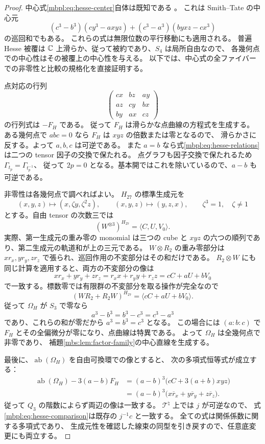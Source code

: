 \begin{proof}
中心式\eqref{mbpl:eq:hesse-center}自体は既知である
\cite[Section~2, p.~3, the formula for $3c_3$]{GRSklyaninDLL}。
これは Smith--Tate の中心元
\[
 (c^3-b^3)(cy^3-a xyz)+(c^3-a^3)(b yxz-cx^3)
\]
の巡回和でもある\cite[p.~35, Remark~(1)]{GRSklyaninST}。
これらの式は無限位数の平行移動にも適用される。
普遍 Hesse 被覆は $\mathbb C$ 上滑らか、従って被約であり、$S_4$ は局所自由なので、
各幾何点での中心性はその被覆上の中心性を与える。
以下では、中心式の全ファイバーでの非零性と比較の規格化を直接証明する。

点対応の行列
\[
 \begin{pmatrix}
 cx&bz&ay\\ az&cy&bx\\ by&ax&cz
 \end{pmatrix}
\]
の行列式は $-F_H$ である。
従って $F_H$ は滑らかな点曲線の方程式を生成する。
ある幾何点で $abc=0$ なら $F_H$ は $xyz$ の倍数または零となるので、
滑らかさに反する。よって $a,b,c$ は可逆である。
また $a=b$ なら式\eqref{mbpl:eq:hesse-relations}は二つの tensor 因子の交換で保たれる。
点グラフも因子交換で保たれるため $\Gamma_{t_p}=\Gamma_{t_p^{-1}}$、
従って $2p=0$ となる。基本開ではこれを除いているので、$a-b$ も可逆である。

非零性は各幾何点で調べればよい。
$H_{27}$ の標準生成元を
\[
 (x,y,z)\longmapsto(x,\zeta y,\zeta^2z),\qquad
 (x,y,z)\longmapsto(y,z,x),\qquad \zeta^3=1,\quad\zeta\ne1
\]
とする。自由 tensor の次数三では
\[
 (W^{\otimes3})^{H_{27}}=\langle C,U,V_0\rangle.
\]
実際、第一生成元の重み零の monomial は三つの cube と
$xyz$ の六つの順列であり、第二生成元の軌道和が上の三元である。
$W\otimes R_2$ の重み零部分は
$xr_x,yr_y,zr_z$ で張られ、巡回作用の不変部分はその和だけである。
$R_2\otimes W$ にも同じ計算を適用すると、両方の不変部分の像は
\[
 xr_x+yr_y+zr_z=r_xx+r_yy+r_zz=cC+aU+bV_0
\]
で一致する。標数零では有限群の不変部分を取る操作が完全なので
\begin{equation}\label{mbpl:eq:hesse-invariant-relation}
 (WR_2+R_2W)^{H_{27}}=\langle cC+aU+bV_0\rangle.
\end{equation}
従って $\Omega_H$ が $S_3$ で零なら
\[
 a^3-b^3=b^3-c^3=c^3-a^3
\]
であり、これらの和が零だから $a^3=b^3=c^3$ となる。
この場合には $(a:b:c)$ で $F_H$ とその全偏微分が零になり、点曲線は特異である。
よって $\Omega_H$ は全幾何点で非零であり、
補題\ref{mbs:lem:factor-family}の中心直線を生成する。

最後に、$\operatorname{ab}(\Omega_H)$ を自由可換環での像とすると、
次の多項式恒等式が成立する：
\begin{equation}\label{mbpl:eq:hesse-abelian-identity}
 \begin{split}
 \operatorname{ab}(\Omega_H)-3(a-b)F_H
  &=(a-b)^3\bigl(cC+3(a+b)xyz\bigr)\\
  &=(a-b)^3\bigl(x\overline r_x+y\overline r_y+z\overline r_z\bigr).
 \end{split}
\end{equation}
従って $Q_3$ の階数によらず両辺の像は一致する。
$\mathcal T^\natural$ 上では $j$ が可逆なので、
式\eqref{mbpl:eq:hesse-comparison}は既存の $j^{-1}c$ と一致する。
全ての式は関係係数に関する多項式であり、
生成元性を確認した線束の同型を引き戻すので、任意底変更にも両立する。
\end{proof}


